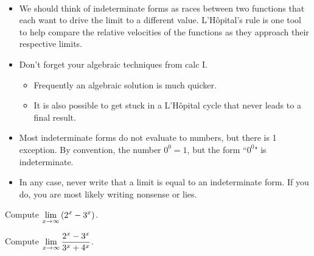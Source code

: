 \newpage

\begin{remark}\,
\begin{itemize}
\item We should think of indeterminate forms as races between two functions that each want to drive the limit to a different value.
L'H\^opital's rule is one tool to help compare the relative velocities of the functions as they approach their respective limits.
\item Don't forget your algebraic techniques from calc I.
\begin{itemize}
\item Frequently an algebraic solution is much quicker.
\item It is also possible to get stuck in a L'H\^opital cycle that never leads to a final result.
\end{itemize}
\item Most indeterminate forms do not evaluate to numbers, but there is 1 exception.  
By convention, the number $0^0 = 1$, but the form ``$0^0$" is indeterminate.  
\item In any case, never write that a limit is equal to an indeterminate form.
If you do, you are most likely writing nonsense or lies.
\end{itemize}
\end{remark}

\begin{example}
Compute $\displaystyle\lim_{x\to\infty}\left(2^x-3^x\right)$.
\end{example}
\ifdefined\SOLUTION
{}
\fi
\vfill


\begin{example}
Compute $\displaystyle\lim_{x\to\infty}\frac{2^x-3^x}{3^x+4^x}$.
\end{example}
\ifdefined\SOLUTION
{}
\fi
\vfill


